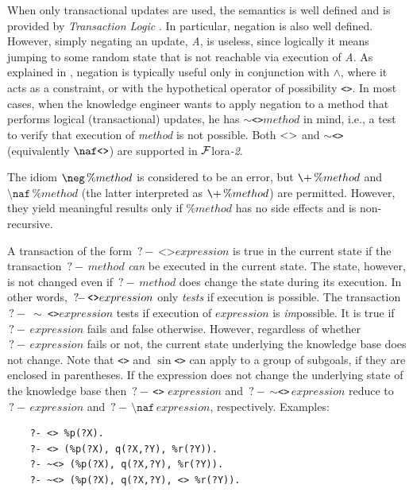 \documentclass[11pt]{article}
\newcommand{\FLORA}{{\mbox{\sc ${\cal F}${lora}\rm\emph{-2}}}\xspace}
\newcommand{\FLSYSTEM}{\FLORA}
\newcommand{\query}{\mbox{$\, ?\! - \, $}}                  %
\newcommand{\bs}{\textbackslash}
\newcommand{\PLGNAF}{\mbox{\texttt{\bs}+}\xspace}
\newcommand{\RULELOGNAF}{{\texttt{{\bs}naf}}\xspace}
\newcommand{\RULELOGNEG}{{\texttt{{\bs}neg}}\xspace}
\begin{document}
When only transactional updates are used, the semantics is well defined and
is provided by \emph{Transaction Logic}
\cite{trans-chapter-98,trans-tcs94}. In particular, negation is also well
defined. However, simply negating an update, \emph{A}, is useless,
since logically it means jumping to some random state that is not
reachable via execution of \emph{A}.  As explained in
\cite{trans-chapter-98,trans-tcs94}, negation is typically useful only in conjunction
with $\wedge$, where it acts as a constraint, or with the hypothetical
operator of possibility \texttt{<>}.  In most cases, when the knowledge
engineer
wants to apply negation to a method that performs logical (transactional)
updates, he has \texttt{$\sim$<>}$method$  in mind, i.e., a test to
verify that execution of \emph{method}  is not possible.
Both $\tt<>$ and \texttt{$\sim$<>} (equivalently $\tt\RULELOGNAF \texttt{<>}$) are supported in \FLSYSTEM.

The idiom ${\tt \RULELOGNEG}\,\%method$ is considered to be an error, but
$\PLGNAF\,\%method$ and $\RULELOGNAF\,\%method$ (the latter interpreted as
$\PLGNAF\,\%method$) are permitted. However, they yield meaningful results only
if $\%method$ has no side effects and is non-recursive.

A transaction of the form $\query \texttt{<>} expression$ is true in the current
state if the transaction $\query method$ \emph{can} be executed in the current
state. The state, however, is not changed even if  $\query method$
does change the state during its execution. In other words, $\texttt{\query <>}
expression$ only \emph{tests} if execution is possible.
The transaction \texttt{\query} \texttt{$\sim$ <>}$expression$ tests if execution of
$expression$ is \emph{im}possible. It is true if $\query expression$ fails
and false otherwise. However, regardless of whether $\query expression$
fails or not, the current state underlying the knowledge base does not
change.
Note that \texttt{<>} and \texttt{$\sin$<>} can apply to a group of
subgoals, if they are enclosed in parentheses.  If the expression does not
change the underlying state of the knowledge base then
\texttt{\query <>} $expression$ and \query\texttt{$\sim$<>}\,$expression$ reduce to
$\query expression$ and $\query \RULELOGNAF\,expression$, respectively.
Examples:
\begin{verbatim}
    ?- <> %p(?X).
    ?- <> (%p(?X), q(?X,?Y), %r(?Y)).
    ?- ~<> (%p(?X), q(?X,?Y), %r(?Y)).
    ?- ~<> (%p(?X), q(?X,?Y), <> %r(?Y)).
\end{verbatim}
\end{document}
